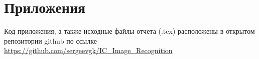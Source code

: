 \section{Приложения}
Код приложения, а также исходные файлы отчета (.tex) расположены в открытом репозитории github по ссылке \\
\href{https://github.com/sergeevgk/IC\_Image\_Recognition}{https://github.com/sergeevgk/IC\_Image\_Recognition}
\protect